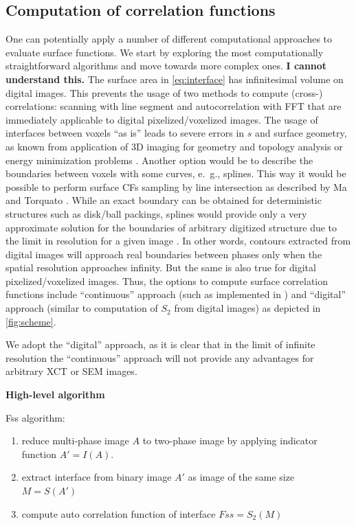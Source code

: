 \documentclass[reprint,amsmath,amssymb,aps,pre]{revtex4-1}
\begin{document}
\subsection{Computation of correlation functions}
One can potentially apply a number of different computational approaches to
evaluate surface functions. We start by exploring the most computationally
straightforward algorithms and move towards more complex ones. \textbf{I cannot
 understand this.} The surface area
in \cref{eq:interface} has infinitesimal volume on digital images. This prevents
the usage of two methods to compute (cross-) correlations: scanning with line
segment and autocorrelation with FFT that are immediately applicable to digital
pixelized/voxelized images. The usage of interfaces between voxels ``as is''
leads to severe errors in $s$ and surface geometry, as known from application of
3D imaging for geometry and topology analysis \cite{AWR_PNM} or energy
minimization problems \cite{jagged_surfaces}. Another option would be to
describe the boundaries between voxels with some curves, e.~g., splines. This
way it would be possible to perform surface CFs sampling by line intersection as
described by Ma and Torquato \cite{Ma_Torq}. While an exact boundary can be
obtained for deterministic structures such as disk/ball packings, splines
would provide only a very approximate solution for the boundaries of arbitrary
digitized structure due to the limit in resolution for a given image
\cite{Eusosoil2012}. In other words, contours extracted from digital images will
approach real boundaries between phases only when the spatial resolution
approaches infinity. But the same is also true for digital pixelized/voxelized
images. Thus, the options to compute surface correlation functions include
``continuous'' approach (such as implemented in \cite{Ma_Torq}) and ``digital''
approach (similar to computation of $S_2$ from digital images) as depicted in
\cref{fig:scheme}.

We adopt the ``digital'' approach, as it is clear that in the limit of infinite
resolution the ``continuous'' approach will not provide any advantages for
arbitrary XCT or SEM images.


\textbf{High-level algorithm}

Fss algorithm:
\begin{enumerate}
    \item reduce multi-phase image $A$ to two-phase image by applying indicator function $A'= I(A)$.
    \item extract interface from binary image $A'$ as image of the same size $M = S(A')$
    \item compute auto correlation function of interface $Fss = S_2(M)$
\end{enumerate}
\end{document}

